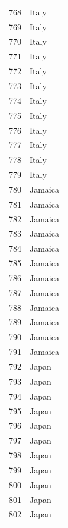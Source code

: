 \documentclass[
  letterpaper,
  DIV=11,
  numbers=noendperiod]{scrreprt}
\begin{document}
\begin{tabular}{ll}
768  &                     Italy \\
769  &                     Italy \\
770  &                     Italy \\
771  &                     Italy \\
772  &                     Italy \\
773  &                     Italy \\
774  &                     Italy \\
775  &                     Italy \\
776  &                     Italy \\
777  &                     Italy \\
778  &                     Italy \\
779  &                     Italy \\
780  &                   Jamaica \\
781  &                   Jamaica \\
782  &                   Jamaica \\
783  &                   Jamaica \\
784  &                   Jamaica \\
785  &                   Jamaica \\
786  &                   Jamaica \\
787  &                   Jamaica \\
788  &                   Jamaica \\
789  &                   Jamaica \\
790  &                   Jamaica \\
791  &                   Jamaica \\
792  &                     Japan \\
793  &                     Japan \\
794  &                     Japan \\
795  &                     Japan \\
796  &                     Japan \\
797  &                     Japan \\
798  &                     Japan \\
799  &                     Japan \\
800  &                     Japan \\
801  &                     Japan \\
802  &                     Japan \\

\end{tabular}
\end{document}
